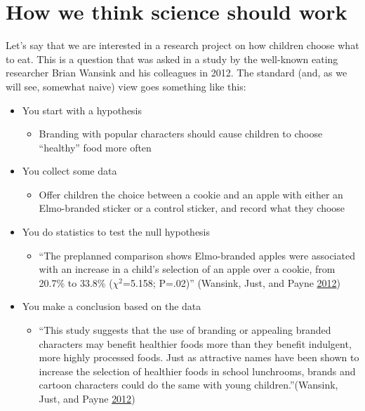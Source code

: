 \documentclass[12pt,]{book}
\providecommand{\tightlist}{%
  \setlength{\itemsep}{0pt}\setlength{\parskip}{0pt}}
\theoremstyle{definition}
\theoremstyle{definition}
\theoremstyle{definition}
\theoremstyle{remark}
\begin{document}
\hypertarget{how-we-think-science-should-work}{%
\section{How we think science should work}\label{how-we-think-science-should-work}}

Let's say that we are interested in a research project on how children choose what to eat. This is a question that was asked in a study by the well-known eating researcher Brian Wansink and his colleagues in 2012. The standard (and, as we will see, somewhat naive) view goes something like this:

\begin{itemize}
\tightlist
\item
  You start with a hypothesis

  \begin{itemize}
  \tightlist
  \item
    Branding with popular characters should cause children to choose ``healthy'' food more often
  \end{itemize}
\item
  You collect some data

  \begin{itemize}
  \tightlist
  \item
    Offer children the choice between a cookie and an apple with either an Elmo-branded sticker or a control sticker, and record what they choose
  \end{itemize}
\item
  You do statistics to test the null hypothesis

  \begin{itemize}
  \tightlist
  \item
    ``The preplanned comparison shows Elmo-branded apples were associated with an increase in a child's selection of an apple over a cookie, from 20.7\% to 33.8\% (\(\chi^2\)=5.158; P=.02)'' (Wansink, Just, and Payne \protect\hyperlink{ref-wans:just:payn:2012}{2012})
  \end{itemize}
\item
  You make a conclusion based on the data

  \begin{itemize}
  \tightlist
  \item
    ``This study suggests that the use of branding or appealing branded characters may benefit healthier foods more than they benefit indulgent, more highly processed foods. Just as attractive names have been shown to increase the selection of healthier foods in school lunchrooms, brands and cartoon characters could do the same with young children.''(Wansink, Just, and Payne \protect\hyperlink{ref-wans:just:payn:2012}{2012})
  \end{itemize}
\end{itemize}
\end{document}
